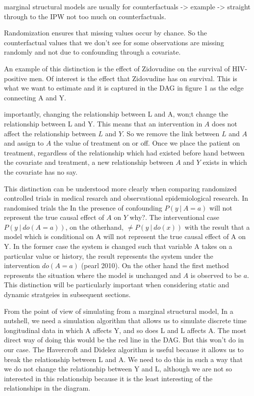 \documentclass[11pt]{article}
\begin{document}
marginal structural models are usually for counterfactuals
-\textgreater{} example -\textgreater{} straight through to the IPW not
too much on counterfactuals.

Randomization ensures that missing values occur by chance. So the
counterfactual values that we don't see for some observations are
missing randomly and not due to confounding through a covariate.

    An example of this distinction is the effect of Zidovudine on the
survival of HIV-positive men. Of interest is the effect that Zidovudine
has on survival. This is what we want to estimate and it is captured in
the DAG in figure 1 as the edge connecting A and Y.

importantly, changing the relationship between L and A, won;t change the
relationship between L and Y. This means that an intervention in \(A\)
does not affect the relationship between \(L\) and \(Y\). So we remove
the link between \(L\) and \(A\) and assign to \(A\) the value of
treatment on or off. Once we place the patient on treatment, regardless
of the relationship which had existed before hand between the covariate
and treatment, a new relationship between \(A\) and \(Y\) exists in
which the covariate has no say.

This distinction can be understood more clearly when comparing
randomized controlled trials in medical resarch and observational
epidemiological research. In randomised trials the In the presence of
confounding \(P(y\ |\ A=a)\) will not represent the true causal effect
of \(A\) on \(Y\) why?. The interventional case \(P(y\ |\ do(A=a))\), on
the otherhand, \(\ne P(y\ |\ do(x))\) with the result that a model which
is conditional on A will not represent the true causal effect of A on Y.
In the former case the system is changed such that variable A takes on a
particular value or history, the result represents the system under the
intervention \(do(A=a)\) (pearl 2010). On the other hand the first
method represents the situation where the model is unchanged and \(A\)
is observed to be \(a\). This distinction will be particularly important
when considering static and dynamic stratgeies in subsequent sections.

From the point of view of simulating from a marginal structural model,
In a nutshell, we need a simulation algorithm that allows us to simulate
discrete time longitudinal data in which A affects Y, and so does L and
L affects A. The most direct way of doing this would be the red line in
the DAG. But this won't do in our case. The Havercroft and Didelez
algorithm is useful because it allows us to break the relationship
between L and A. We need to do this in such a way that we do not change
the relationship between Y and L, although we are not so interested in
this relationship because it is the least interesting of the
relationships in the diagram.
\end{document}
